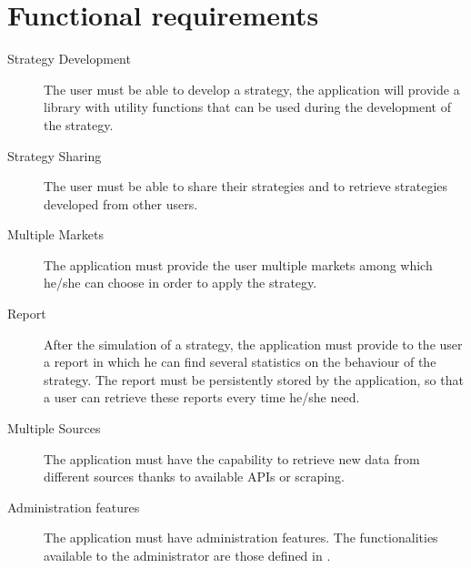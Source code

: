 \section{Functional requirements}\label{sec:functionalrequirements}

\begin{description}
	\item[Strategy Development] The user must be able to develop a strategy,
		the application will provide a library with utility functions
		that can be used during the development of the strategy.
	\item[Strategy Sharing] The user must be able to share their strategies
		and to retrieve strategies developed from other users.
	\item[Multiple Markets] The application must provide the user multiple
		markets among which he/she can choose in order to apply the
		strategy.
	\item[Report] After the simulation of a strategy, the application must
		provide to the user a report in which he can find several
		statistics on the behaviour of the strategy. The report must be
		persistently stored by the application, so that a user can
		retrieve these reports every time he/she need.
	\item[Multiple Sources] The application must have the capability to
		retrieve new data from different sources thanks to available
		APIs or scraping.
	\item[Administration features] The application must have
		administration features. The functionalities available to the
		administrator are those defined in .
\end{description}
